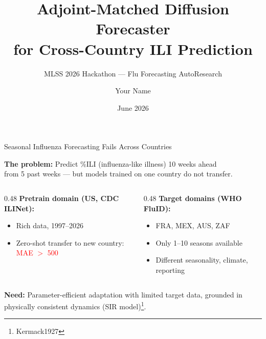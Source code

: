 \documentclass[10pt]{beamer}
\title[Adjoint-Matched Diffusion for ILI]{Adjoint-Matched Diffusion Forecaster\\for Cross-Country ILI Prediction}
\subtitle{MLSS 2026 Hackathon --- Flu Forecasting AutoResearch}
\author{Your Name}
\institute{MLSS 2026}
\date{June 2026}
\newcommand{\papercite}[1]{\footnote{\tiny #1}}
\begin{document}
\begin{frame}
  \titlepage
\end{frame}

\begin{frame}{Seasonal Influenza Forecasting Fails Across Countries}

  \textbf{The problem:} Predict \%ILI (influenza-like illness) 10 weeks ahead\\
  from 5 past weeks --- but models trained on one country do not transfer.

  \vspace{0.3cm}
  \begin{columns}
    \begin{column}{0.48\textwidth}
      \textbf{Pretrain domain (US, CDC ILINet):}
      \begin{itemize}
        \item Rich data, 1997--2026
        \item Zero-shot transfer to new country:\\
              \hspace{0.3cm}\textcolor{red}{MAE $>$ 500}
      \end{itemize}
    \end{column}
    \begin{column}{0.48\textwidth}
      \textbf{Target domains (WHO FluID):}
      \begin{itemize}
        \item FRA, MEX, AUS, ZAF
        \item Only 1--10 seasons available
        \item Different seasonality, climate, reporting
      \end{itemize}
    \end{column}
  \end{columns}

  \vspace{0.3cm}
  \textbf{Need:} Parameter-efficient adaptation with limited target data,
  grounded in physically consistent dynamics (SIR model)\papercite{Kermack1927}.

\end{frame}
\end{document}
